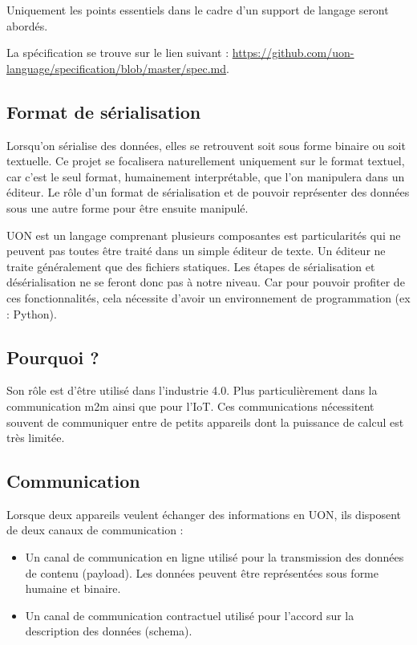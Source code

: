 \documentclass[
    iict, %
    il, %
]{heig-tb}
\begin{document}
Uniquement les points essentiels dans le cadre d'un support de langage seront abordés.

La spécification se trouve sur le lien suivant : \url{https://github.com/uon-language/specification/blob/master/spec.md}.

\subsection{Format de sérialisation}

Lorsqu'on sérialise des données, elles se retrouvent soit sous forme binaire ou soit textuelle.
Ce projet se focalisera naturellement uniquement sur le format textuel, car c'est le seul format, humainement interprétable, que l'on manipulera dans un éditeur.
Le rôle d'un format de sérialisation et de pouvoir représenter des données sous une autre forme pour être ensuite manipulé.

UON est un langage comprenant plusieurs composantes est particularités qui ne peuvent pas toutes être traité dans un simple éditeur de texte.
Un éditeur ne traite généralement que des fichiers statiques.
Les étapes de sérialisation et désérialisation ne se feront donc pas à notre niveau.
Car pour pouvoir profiter de ces fonctionnalités, cela nécessite d'avoir un environnement de programmation (ex : Python).

\subsection{Pourquoi ?}
Son rôle est d'être utilisé dans l'industrie 4.0. Plus particulièrement dans la communication \Gls{m2m} ainsi que pour l'\Gls{IoT}.
Ces communications nécessitent souvent de communiquer entre de petits appareils dont la puissance de calcul est très limitée.

\subsection{Communication}
Lorsque deux appareils veulent échanger des informations en UON, ils disposent de deux canaux de communication :
\begin{itemize}
    \item Un canal de communication en ligne utilisé pour la transmission des données de contenu (payload). Les données peuvent être représentées sous forme humaine et binaire.
    \item Un canal de communication contractuel utilisé pour l'accord sur la description des données (schema).
\end{itemize}
\end{document}
